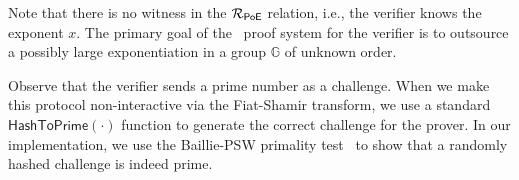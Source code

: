 Note that there is no witness in the $\mathcal{R}_{\mathsf{PoE}}$ relation, i.e., the verifier knows the exponent $x$. The primary goal of the \poe\ proof system for the verifier is to outsource a possibly large exponentiation in a group $\mathbb{G}$ of unknown order.



Observe that the verifier sends a prime number as a challenge. When we make this protocol non-interactive via the Fiat-Shamir transform, we use a standard $\textsf{HashToPrime}(\cdot)$ function to generate the correct challenge for the prover. In our implementation, we use the Baillie-PSW primality test~\cite{PomSelWag80} to show that a randomly hashed challenge is indeed prime. 



% 


% 

